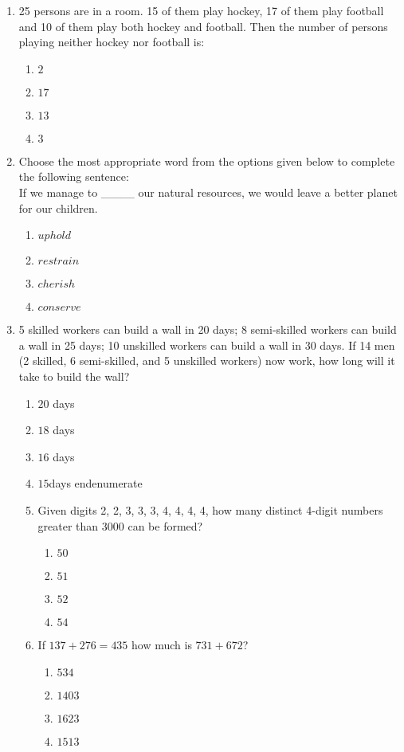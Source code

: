 \documentclass[journal,12pt,onecolumn]{IEEEtran}
\theoremstyle{remark}
\begin{document}
\begin{enumerate}
\item 25 persons are in a room. 15 of them play hockey, 17 of them play football and 10 of them play both hockey and football. Then the number of persons playing neither hockey nor football is:
    \begin{enumerate}
        \item $  2 $
        \item $  17 $
        \item $  13 $
        \item $  3 $
    \end{enumerate}

    \item Choose the most appropriate word from the options given below to complete the following sentence: \\
    {If we manage to \_\_\_\_ our natural resources, we would leave a better planet for our children.}
    \begin{enumerate}
        \item $  {uphold} $
        \item $  {restrain} $
        \item $  {cherish} $
        \item $  {conserve} $
    \end{enumerate}

    \item 5 skilled workers can build a wall in 20 days; 8 semi-skilled workers can build a wall in 25 days; 10 unskilled workers can build a wall in 30 days. If 14 men (2 skilled, 6 semi-skilled, and 5 unskilled workers) now work, how long will it take to build the wall?
    \begin{enumerate}
        \item $  20 $ days 
        \item $  18 $ days 
        \item $  16$  days 
        \item $  15$days 
    end{enumerate}

    \item Given digits 2, 2, 3, 3, 3, 4, 4, 4, 4, how many distinct 4-digit numbers greater than 3000 can be formed?
    \begin{enumerate}
        \item $  50 $
        \item $  51 $
        \item $ 52 $
        \item $ 54 $
    \end{enumerate}
\item If $137 + 276 = 435$ how much is $731 + 672$?
\begin{enumerate}
    \item $534$
    \item $1403$
    \item $1623$
    \item $1513$
\end{enumerate}


\end{enumerate}
\end{enumerate}
\end{document}
